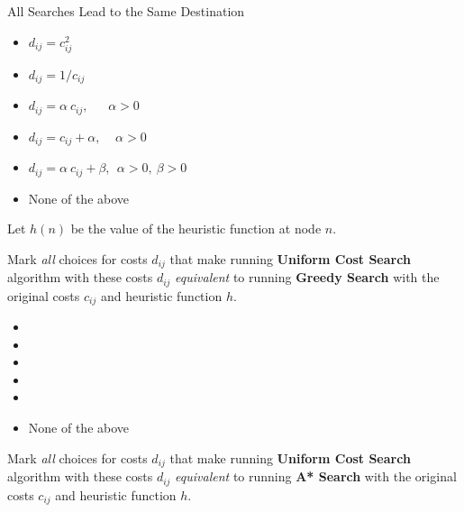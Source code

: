 \begin{problem}{All Searches Lead to the Same Destination}
\begin{question}[2]
\begin{itemize}
	\item[]\solution{\emptycircle}{\Twoci} $d_{ij} = c_{ij}^2$
	\item[]\solution{\emptycircle}{\Twocii} $d_{ij} = 1/c_{ij}$
	\item[]\solution{\emptycircle}{\Twociii}  $d_{ij} = \alpha\ c_{ij}, \ \ \ \ \ \ \ \alpha > 0$
	\item[]\solution{\emptycircle}{\Twociv} $d_{ij} = c_{ij} + \alpha, \ \ \ \ \ \alpha > 0$
	\item[]\solution{\emptycircle}{\Twocv}  $d_{ij} = \alpha \ c_{ij} + \beta, \ \ \alpha > 0,\ \beta > 0$
	\item[]\solution{\emptycircle}{\Twocvi} None of the above
	\end{itemize} \solution{\vspace{1cm}}{}\end{question}
\begin{question}
Let $h(n)$ be the value of the heuristic function at node $n$.
\begin{subquestion}[2]
Mark \emph{all} choices for costs $d_{ij}$  that make running {\bf
  Uniform Cost Search} algorithm with these costs $d_{ij}$ 
\emph{equivalent} to running {\bf Greedy Search} with the
original costs $c_{ij}$ and heuristic function $h$.
	\begin{itemize}
	\item[]\solution{\emptycircle}{\Twodia}  
	\item[]\solution{\emptycircle}{\Twodib}  
	\item[]\solution{\emptycircle}{\Twodic}  
	\item[]\solution{\emptycircle}{\Twodid}  
	\item[]\solution{\emptycircle}{\Twodie}  
	\item[]\solution{\emptycircle}{\Twodif} None of the above
	\end{itemize} 
  \solution{\vspace{1cm}}{
    }
\end{subquestion}
\vspace{1cm}
\begin{subquestion}[2]
Mark \emph{all} choices for costs $d_{ij}$  that make running {\bf
  Uniform Cost Search} algorithm with these costs $d_{ij}$ 
\emph{equivalent} to running {\bf A* Search} with the
original costs $c_{ij}$ and heuristic function $h$.

\end{subquestion}
\end{question}
\end{problem}
